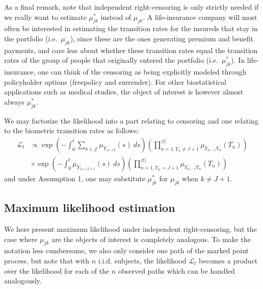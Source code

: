 \documentclass[a4paper,10pt,openany]{book}
\begin{document}
As a final remark, note that independent right-censoring is only strictly needed if we really want to estimate \(\mu^*_{jk}\) instead of \(\mu_{jk}\). A life-insurance company will most often be interested in estimating the transition rates for the insureds that stay in the portfolio (i.e.~\(\mu_{jk}\)), since these are the ones generating premium and benefit payments, and care less about whether these transition rates equal the transition rates of the group of people that originally entered the portfolio (i.e.~\(\mu^*_{jk}\)). In life-insurance, one can think of the censoring as being explicitly modeled through policyholder options (freepolicy and surrender). For other biostatistical applications such as medical studies, the object of interest is however almost always \(\mu^*_{jk}\).

We may factorize the likelihood into a part relating to censoring and one relating to the biometric transition rates as follows:
\begin{align*}
\mathcal L_t&\propto \exp\left(-\int_0^t  \sum_{k\in\mathcal J}\mu_{Y_{\langle s-\rangle k}}(s)\ ds\right)\left(\prod_{n=1,Y_n\ne J+1}^{\langle t\rangle}  \mu_{Y_{n-1}Y_n}(T_n)\right)\\
&\times\exp\left(-\int_0^t  \mu_{Y_{\langle s-\rangle J+1}}(s)\ ds\right)\left(\prod_{n=1,Y_n= J+1}^{\langle t\rangle}  \mu_{Y_{n-1}Y_n}(T_n)\right)
\end{align*}
and under Assumption 1, one may substitute \(\mu^*_{jk}\) for \(\mu_{jk}\) when \(k\ne J + 1\).

\hypertarget{maximum-likelihood-estimation}{%
\subsection{Maximum likelihood estimation}\label{maximum-likelihood-estimation}}

We here present maximum likelihood under independent right-censoring, but the case where \(\mu_{jk}\) are the objects of interest is completely analogous. To make the notation less cumbersome, we also only consider one path of the marked point process, but note that with \(n\) i.i.d. subjects, the likelihood \(\mathcal L_t\) becomes a product over the likelihood for each of the \(n\) observed paths which can be handled analogously.
\end{document}
